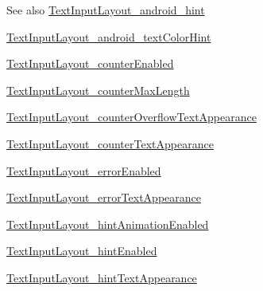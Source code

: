\begin{DoxySeeAlso}{See also}
\hyperlink{classandroid_1_1support_1_1v4_1_1R_1_1styleable_a0337fe9d70637bd62592e7b41ccd5850}{Text\+Input\+Layout\+\_\+android\+\_\+hint} 

\hyperlink{classandroid_1_1support_1_1v4_1_1R_1_1styleable_a10cd7921092af5c7b2f2f95b6735bc64}{Text\+Input\+Layout\+\_\+android\+\_\+text\+Color\+Hint} 

\hyperlink{classandroid_1_1support_1_1v4_1_1R_1_1styleable_aaf7513c377000dc3bef62cf4084e03c2}{Text\+Input\+Layout\+\_\+counter\+Enabled} 

\hyperlink{classandroid_1_1support_1_1v4_1_1R_1_1styleable_a493f8299f04aee557c2fb4f3baaaea72}{Text\+Input\+Layout\+\_\+counter\+Max\+Length} 

\hyperlink{classandroid_1_1support_1_1v4_1_1R_1_1styleable_a0d4416285c0952ef775840d271901791}{Text\+Input\+Layout\+\_\+counter\+Overflow\+Text\+Appearance} 

\hyperlink{classandroid_1_1support_1_1v4_1_1R_1_1styleable_aeb2a80f0f76cdaa1ff3b2b05d42b6356}{Text\+Input\+Layout\+\_\+counter\+Text\+Appearance} 

\hyperlink{classandroid_1_1support_1_1v4_1_1R_1_1styleable_a1524c63d3a980ad9efb17c1c648871c2}{Text\+Input\+Layout\+\_\+error\+Enabled} 

\hyperlink{classandroid_1_1support_1_1v4_1_1R_1_1styleable_af9ca4eaf2eb93f555c4c269831af4712}{Text\+Input\+Layout\+\_\+error\+Text\+Appearance} 

\hyperlink{classandroid_1_1support_1_1v4_1_1R_1_1styleable_a4c514fcd5878b74c6f2da4d89d933eef}{Text\+Input\+Layout\+\_\+hint\+Animation\+Enabled} 

\hyperlink{classandroid_1_1support_1_1v4_1_1R_1_1styleable_a9b9008f58fe52182cb029310ed5338c2}{Text\+Input\+Layout\+\_\+hint\+Enabled} 

\hyperlink{classandroid_1_1support_1_1v4_1_1R_1_1styleable_af051809dff99b96f096bb56e82505858}{Text\+Input\+Layout\+\_\+hint\+Text\+Appearance} 
\end{DoxySeeAlso}
\mbox{\label{classandroid_1_1support_1_1v4_1_1R_1_1styleable_a0337fe9d70637bd62592e7b41ccd5850}} 
